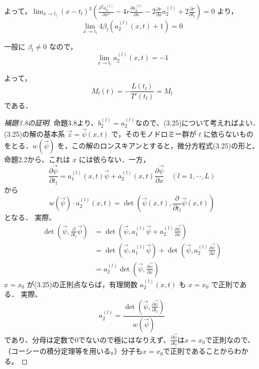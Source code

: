 よって，$\displaystyle \lim_{x \to t_l} (x-t_l)^3 \left( \frac{\partial^3 a_2^{(l)}}{\partial x^3} - 4r \frac{\partial a_2^{(l)}}{\partial x} - 2\frac{\partial r}{\partial x} a_2^{(l)} + 2\frac{\partial r}{\partial t_l} \right) = 0$ より，
\begin{equation*}
    \lim_{x \to t_l} 4\beta_l \left( a_2^{(l)}(x,t) + 1 \right) = 0
\end{equation*}

一般に $\beta_l \neq 0$ なので，
\[
\lim_{x \to t_l} a_2^{(l)}(x,t) = -1
\]

よって，
\[
M_l(t) = - \frac{L(t_l)}{T'(t_l)} = M_l
\]
である．

\begin{story}
\begin{proof}[補題3.8の証明]
命題3.8より、$b_{2}^{(l)}=a_{2}^{(l)}$なので、(3.25)について考えればよい．(3.25)の解の基本系 $\vec{z} = \vec{\psi}(x,t)$ で，そのモノドロミー群が $t$ に依らないものをとる．$w(\vec{\psi})$ を，この解のロンスキアンとすると，微分方程式(3.25)の形と、命題2.2から、これは $x$ には依らない．一方，
\[
\frac{\partial \vec{\psi}}{\partial t_{l}} = a_{1}^{(l)}(x,t)\vec{\psi}+a_{2}^{(l)}(x,t)\frac{\partial\vec{\psi}}{\partial x} \quad (l=1,\cdots,L)
\]
から
\begin{equation}
    w(\vec{\psi}) \cdot a_2^{(l)}(x,t) = \det \left( \vec{\psi}(x,t), \frac{\partial}{\partial t_l}\vec{\psi}(x,t) \right) \label{eq:3.90}
\end{equation}
となる．
実際、
\begin{align*}
\det \left( \vec{\psi}, \frac{\partial}{\partial t_l}\vec{\psi}\right)&=\det \left( \vec{\psi}, a_{1}^{(l)}\vec{\psi}+a_{2}^{(l)}\frac{\partial\vec{\psi}}{\partial x}\right)\\
&=\det \left( \vec{\psi}, a_{1}^{(l)}\vec{\psi} \right)+\det \left(\vec{\psi}, a_{2}^{(l)}\frac{\partial\vec{\psi}}{\partial x}\right)\\
&=a_{2}^{(l)}\det \left(\vec{\psi}, \frac{\partial\vec{\psi}}{\partial x}\right)
\end{align*}
$x=x_0$ が(3.25)の正則点ならば，有理関数 $a_2^{(l)}(x,t)$ も $x=x_0$ で正則である．
実際、
\[
a_{2}^{(l)}=\frac{\det \left( \vec{\psi}, \frac{\partial\vec{\psi}}{\partial t_l}\right)}{w(\vec{\psi})}
\]
であり、分母は定数で0でないので極にはなりえず、$\frac{\partial\vec{\psi}}{\partial t_l}$は$x=x_{0}$で正則なので、（コーシーの積分定理等を用いる。）分子も$x=x_{0}$で正則であることからわかる。


\end{proof}
\end{story}
